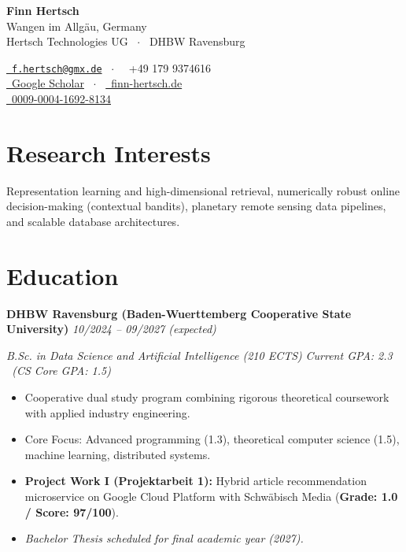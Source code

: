 \documentclass[10pt, a4paper]{article}
\newcommand{\cvitem}[2]{
  \vspace{1.5pt}
  \noindent\textbf{#1} \hfill \textit{#2} \par
  \vspace{-1pt}
}
\begin{document}
\noindent
\begin{minipage}[t]{0.52\textwidth}
  {\Huge \textbf{Finn Hertsch}} \\[3pt]
  Wangen im Allg{\"a}u, Germany \\
  Hertsch Technologies UG \ $\cdot$ \ DHBW Ravensburg
\end{minipage}\hfill
\begin{minipage}[t]{0.46\textwidth}
  \raggedleft
  \href{mailto:f.hertsch@gmx.de}{\faEnvelope\ \texttt{f.hertsch@gmx.de}} \ $\cdot$ \ \faPhone\ +49 179 9374616 \\
  \href{https://scholar.google.com/citations?user=JZoMIcMAAAAJ&hl=en}{\faGraduationCap\ Google Scholar} \ $\cdot$ \ \href{https://finn-hertsch.de}{\faGlobe\ finn-hertsch.de} \\
  \href{https://orcid.org/0009-0004-1692-8134}{\faOrcid\ 0009-0004-1692-8134}
\end{minipage}

\vspace{4pt}

\section*{Research Interests}
Representation learning and high-dimensional retrieval, numerically robust online decision-making (contextual bandits), planetary remote sensing data pipelines, and scalable database architectures.

\section*{Education}

\cvitem{DHBW Ravensburg (Baden-Wuerttemberg Cooperative State University)}{10/2024 -- 09/2027 (expected)}
\textit{B.Sc. in Data Science and Artificial Intelligence (210 ECTS)} \hfill \textit{Current GPA: 2.3 \ (CS Core GPA: 1.5)}\\
\vspace{-4pt}
\begin{itemize}[leftmargin=0.15in, label=\textbullet, itemsep=1pt, topsep=1.5pt]
  \item Cooperative dual study program combining rigorous theoretical coursework with applied industry engineering.
  \item Core Focus: Advanced programming (1.3), theoretical computer science (1.5), machine learning, distributed systems.
  \item \textbf{Project Work I (Projektarbeit 1):} Hybrid article recommendation microservice on Google Cloud Platform with Schw{\"a}bisch Media (\textbf{Grade: 1.0 / Score: 97/100}).
  \item \textit{Bachelor Thesis scheduled for final academic year (2027).}
\end{itemize}
\end{document}
